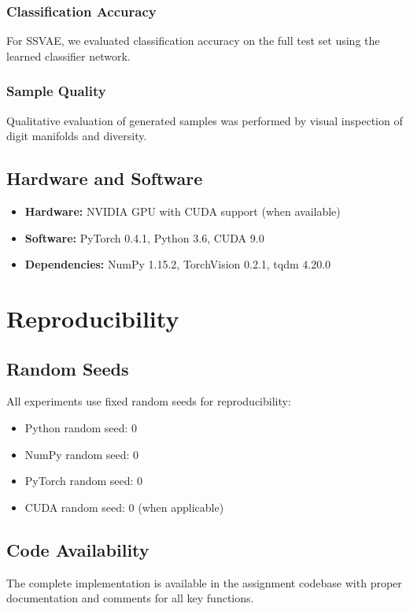 \documentclass{article}
\begin{document}
\subsubsection{Classification Accuracy}
For SSVAE, we evaluated classification accuracy on the full test set using the learned classifier network.

\subsubsection{Sample Quality}
Qualitative evaluation of generated samples was performed by visual inspection of digit manifolds and diversity.

\subsection{Hardware and Software}

\begin{itemize}
\item \textbf{Hardware:} NVIDIA GPU with CUDA support (when available)
\item \textbf{Software:} PyTorch 0.4.1, Python 3.6, CUDA 9.0
\item \textbf{Dependencies:} NumPy 1.15.2, TorchVision 0.2.1, tqdm 4.20.0
\end{itemize}

\section{Reproducibility}

\subsection{Random Seeds}
All experiments use fixed random seeds for reproducibility:
\begin{itemize}
\item Python random seed: 0
\item NumPy random seed: 0
\item PyTorch random seed: 0
\item CUDA random seed: 0 (when applicable)
\end{itemize}

\subsection{Code Availability}
The complete implementation is available in the assignment codebase with proper documentation and comments for all key functions.
\end{document}
